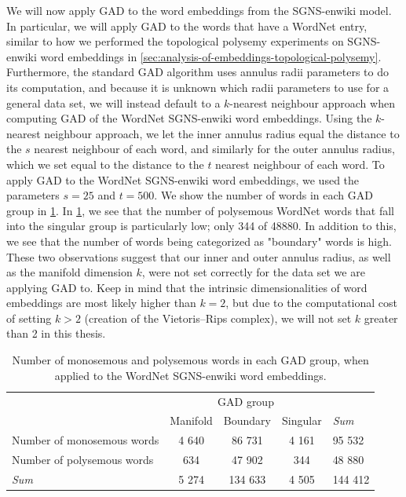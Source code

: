 We will now apply GAD to the word embeddings from the SGNS-enwiki model. In particular, we will apply GAD to the words that have a WordNet entry, similar to how we performed the topological polysemy experiments on SGNS-enwiki word embeddings in \cref{sec:analysis-of-embeddings-topological-polysemy}. Furthermore, the standard GAD algorithm uses annulus radii parameters to do its computation, and because it is unknown which radii parameters to use for a general data set, we will instead default to a $k$-nearest neighbour approach when computing GAD of the WordNet SGNS-enwiki word embeddings. Using the $k$-nearest neighbour approach, we let the inner annulus radius equal the distance to the $s$ nearest neighbour of each word, and similarly for the outer annulus radius, which we set equal to the distance to the $t$ nearest neighbour of each word. To apply GAD to the WordNet SGNS-enwiki word embeddings, we used the parameters $s=25$ and $t=500$. We show the number of words in each GAD group in \cref{table:number-of-words-gad-polysemous-sgns-enwiki-wordnet}. In \cref{table:number-of-words-gad-polysemous-sgns-enwiki-wordnet}, we see that the number of polysemous WordNet words that fall into the singular group is particularly low; only 344 of 48880. In addition to this, we see that the number of words being categorized as "boundary" words is high. These two observations suggest that our inner and outer annulus radius, as well as the manifold dimension $k$, were not set correctly for the data set we are applying GAD to. Keep in mind that the intrinsic dimensionalities of word embeddings are most likely higher than $k=2$, but due to the computational cost of setting $k > 2$ (creation of the Vietoris–Rips complex), we will not set $k$ greater than 2 in this thesis.
\begin{table}[H]
    \centering
    \begin{tabular}{@{}lcccl@{}}
    \toprule
    \multicolumn{1}{c}{}       & \multicolumn{3}{c}{GAD group}  & \multicolumn{1}{l}{} \\ \cmidrule(lr){2-4}
    \multicolumn{1}{c}{}       & Manifold & Boundary & Singular & \textit{Sum}                  \\ \midrule
    \trcolor Number of monosemous words            & 4 640     & 86 731    & 4 161     & 95 532                \\
    Number of polysemous words & 634      & 47 902    & 344      & 48 880                \\ \midrule
    \trcolor \textit{Sum}                        & 5 274     & 134 633   & 4 505     & 144 412 \\ \bottomrule
    \end{tabular}
    \caption{Number of monosemous and polysemous words in each GAD group, when applied to the WordNet SGNS-enwiki word embeddings.}
    \label{table:number-of-words-gad-polysemous-sgns-enwiki-wordnet}
\end{table}

